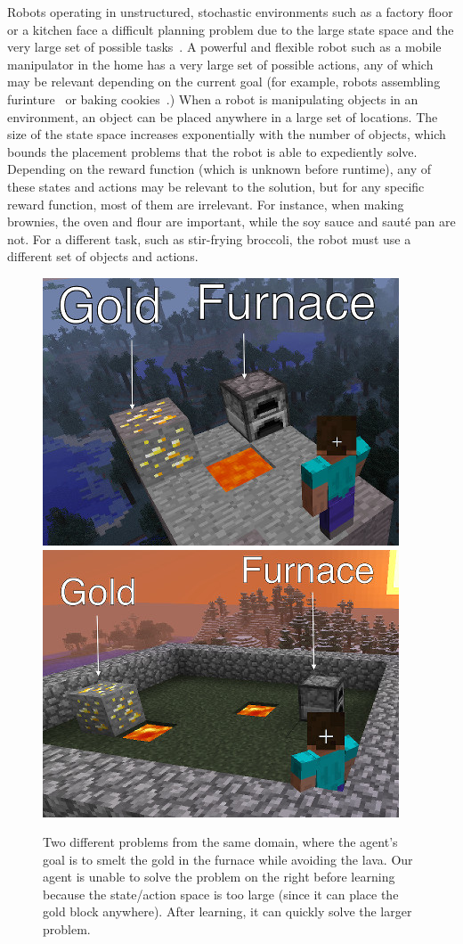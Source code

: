 Robots operating in unstructured, stochastic environments such as a
factory floor or a kitchen face a difficult planning problem due to
the large state space and the very large set of possible
tasks~\citep{bollini12,knepper13}.  A powerful and flexible robot such
as a mobile manipulator in the home has a very large set of possible
actions, any of which may be relevant depending on the current goal
(for example, robots assembling furinture~\citep{knepper13} or baking
cookies~\citep{bollini12}.)  When a robot is manipulating objects in
an environment, an object can be placed anywhere in a large set of
locations.  The size of the state space increases exponentially with
the number of objects, which bounds the placement problems that the
robot is able to expediently solve.  Depending on the reward function
(which is unknown before runtime), any of these states and actions may
be relevant to the solution, but for any specific reward function,
most of them are irrelevant.  For instance, when making brownies, the
oven and flour are important, while the soy sauce and saut\'{e} pan
are not.  For a different task, such as stir-frying broccoli, the
robot must use a different set of objects and
actions. 
\begin{figure}
\centering
\includegraphics[width=0.25\linewidth]{figures/smelt_small.jpg}
\includegraphics[width=0.25\linewidth]{figures/smelt_large.jpg}
\caption{Two different problems from the same domain, where the
  agent's goal is to smelt the gold in the furnace while avoiding the
  lava.  Our agent is unable to solve the problem on the right before
  learning because the state/action space is too large (since it can
  place the gold block anywhere).  After learning, it can quickly
  solve the larger problem.\label{fig:example}}
\end{figure}


